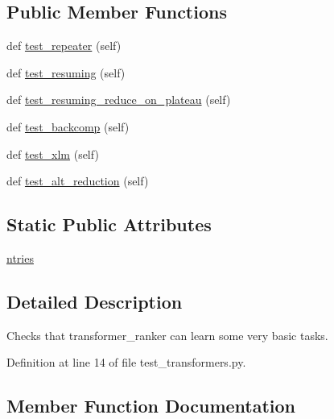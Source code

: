 \subsection*{Public Member Functions}
\begin{DoxyCompactItemize}
\item 
def \hyperlink{classtests_1_1test__transformers_1_1TestTransformerRanker_a386da89601a1778da3844cf901df3697}{test\+\_\+repeater} (self)
\item 
def \hyperlink{classtests_1_1test__transformers_1_1TestTransformerRanker_a55dff1bae7f3fef267f2437423ee008f}{test\+\_\+resuming} (self)
\item 
def \hyperlink{classtests_1_1test__transformers_1_1TestTransformerRanker_aaaf8b461c4f6460c770c1717c6cf9f5c}{test\+\_\+resuming\+\_\+reduce\+\_\+on\+\_\+plateau} (self)
\item 
def \hyperlink{classtests_1_1test__transformers_1_1TestTransformerRanker_a63dd66de96a7eee38a2bf477bd27441f}{test\+\_\+backcomp} (self)
\item 
def \hyperlink{classtests_1_1test__transformers_1_1TestTransformerRanker_a2a4671741d853fa9ff5bf484ec98487c}{test\+\_\+xlm} (self)
\item 
def \hyperlink{classtests_1_1test__transformers_1_1TestTransformerRanker_a511fbe2d896e28baff21f5c9e7f0b0b4}{test\+\_\+alt\+\_\+reduction} (self)
\end{DoxyCompactItemize}
\subsection*{Static Public Attributes}
\begin{DoxyCompactItemize}
\item 
\hyperlink{classtests_1_1test__transformers_1_1TestTransformerRanker_ac580716d99f1d6e925acdf3deee22def}{ntries}
\end{DoxyCompactItemize}


\subsection{Detailed Description}
\begin{DoxyVerb}Checks that transformer_ranker can learn some very basic tasks.\end{DoxyVerb}
 

Definition at line 14 of file test\+\_\+transformers.\+py.



\subsection{Member Function Documentation}
\mbox{\label{classtests_1_1test__transformers_1_1TestTransformerRanker_a511fbe2d896e28baff21f5c9e7f0b0b4}} 
